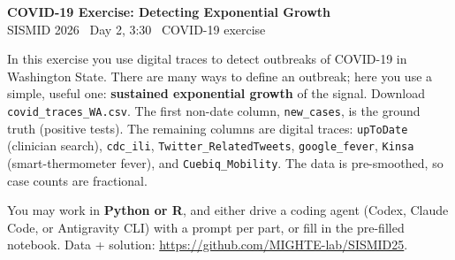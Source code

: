 \documentclass[11pt]{article}
\begin{document}
\begin{center}
  {\Large\bfseries COVID-19 Exercise: Detecting Exponential Growth}\\[2pt]
  {\normalsize SISMID 2026 \textbullet\ Day 2, 3:30 \textbullet\ COVID-19 exercise}
\end{center}

\medskip

In this exercise you use digital traces to detect outbreaks of COVID-19 in Washington State.
There are many ways to define an outbreak; here you use a simple, useful one: \textbf{sustained
exponential growth} of the signal. Download \texttt{covid\_traces\_WA.csv}. The first
non-date column, \texttt{new\_cases}, is the ground truth (positive tests). The remaining
columns are digital traces: \texttt{upToDate} (clinician search), \texttt{cdc\_ili},
\texttt{Twitter\_RelatedTweets}, \texttt{google\_fever}, \texttt{Kinsa} (smart-thermometer
fever), and \texttt{Cuebiq\_Mobility}. The data is pre-smoothed, so case counts are
fractional.

You may work in \textbf{Python or R}, and either drive a coding agent (Codex, Claude Code, or
Antigravity CLI) with a prompt per part, or fill in the pre-filled notebook. Data + solution:
\url{https://github.com/MIGHTE-lab/SISMID25}.
\end{document}
